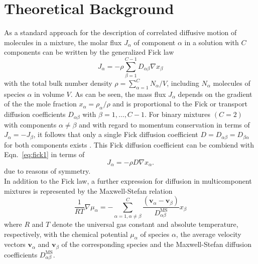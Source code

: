 \documentclass[aip,jcp,reprint]{revtex4-1}
\begin{document}
\section{Theoretical Background}
As a standard approach for  the description  of correlated diffusive motion of molecules in a mixture, the molar flux $J_{\alpha}$ of component $\alpha$ in a solution with $C$ components can be written by the generalized Fick law \cite{liu13a,bird04a}
\begin{equation}
\label{eq:fick1}
J_{\alpha}=- \rho \sum_{\beta=1}^{C-1} D_{\alpha\beta} \nabla x_{\beta}
\end{equation}
with the total bulk number density $\rho=\sum_{\alpha=1}^CN_{\alpha}/V$, including $N_{\alpha}$ molecules of species $\alpha$ in volume $V$. As can be seen, the mass flux $J_{\alpha}$ depends on the gradient of the the mole fraction $x_{\alpha}=\rho_{\alpha}/\rho$ and is proportional to the Fick or transport diffusion coefficients $D_{\alpha\beta}$ with $\beta=1,\ldots,C-1$. 
For binary mixtures $(C=2)$ with components $\alpha\neq \beta$ and with regard to momentum conservation in terms of  $J_{\alpha} = - J_{\beta}$,  it follows that only a single Fick diffusion coefficient $D=D_{\alpha\beta}=D_{\beta\alpha}$ for both components exists \cite{liu13a,taylor93a,newman12a}. This Fick diffusion coefficient can be combiend with Eqn.~\eqref{eq:fick1} in terms of 
\begin{equation}
\label{eq:fickbin}
J_{\alpha}= -\rho D \nabla x_{\alpha}.
\end{equation}
due to reasons of symmetry.\\
In addition to the Fick law, a further expression for diffusion in multicomponent mixtures \cite{liu13a} is  represented by the 
Maxwell-Stefan relation \cite{liu13a,bird04a}
\begin{equation}
\label{eq:msd}
\frac{1}{RT}\nabla\mu_{\alpha} = -\sum_{\alpha=1,\alpha\neq \beta}^{C}\frac{(\mathbf{v}_{\alpha}-\mathbf{v}_{\beta})}{D_{\alpha\beta}^{\text{MS}}}x_{\beta}
\end{equation}
where $R$ and $T$ denote the universal gas constant and absolute temperature, respectively, with the chemical potential $\mu_{\alpha}$ of species $\alpha$, the average velocity vectors $\mathbf{v}_{\alpha}$ and $\mathbf{v}_{\beta}$ of the corresponding species and the Maxwell-Stefan diffusion coefficients $D_{\alpha\beta}^{\text{MS}}$.
\end{document}

